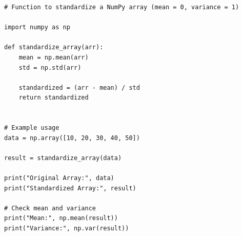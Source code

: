 \begin{verbatim}
# Function to standardize a NumPy array (mean = 0, variance = 1)

import numpy as np

def standardize_array(arr):
    mean = np.mean(arr)
    std = np.std(arr)
    
    standardized = (arr - mean) / std
    return standardized


# Example usage
data = np.array([10, 20, 30, 40, 50])

result = standardize_array(data)

print("Original Array:", data)
print("Standardized Array:", result)

# Check mean and variance
print("Mean:", np.mean(result))
print("Variance:", np.var(result))
\end{verbatim}